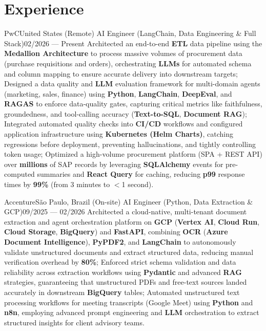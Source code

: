 \section{Experience}
\resumeSubHeadingListStart

\resumeSubheading
{PwC}{United States (Remote)}
{AI Engineer (LangChain, Data Engineering \& Full Stack)}{02/2026 --- Present}
\resumeItemListStart
\resumeItemShort
{Architected an end-to-end \textbf{ETL} data pipeline using the \textbf{Medallion Architecture} to process massive volumes of procurement data (purchase requisitions and orders), orchestrating \textbf{LLMs} for automated schema and column mapping to ensure accurate delivery into downstream targets;}
\resumeItemShort
{Designed a data quality and \textbf{LLM} evaluation framework for multi-domain agents (marketing, sales, finance) using \textbf{Python}, \textbf{LangChain}, \textbf{DeepEval}, and \textbf{RAGAS} to enforce data-quality gates, capturing critical metrics like faithfulness, groundedness, and tool-calling accuracy (\textbf{Text-to-SQL}, \textbf{Document RAG});}
\resumeItemShort
{Integrated automated quality checks into \textbf{CI/CD} workflows and configured application infrastructure using \textbf{Kubernetes (Helm Charts)}, catching regressions before deployment, preventing hallucinations, and tightly controlling token usage;}
\resumeItemShort
{Optimized a high-volume procurement platform (SPA + REST API) over \textbf{millions} of SAP records by leveraging \textbf{SQLAlchemy} events for pre-computed summaries and \textbf{React Query} for caching, reducing \textbf{p99} response times by \textbf{99\%} (from 3 minutes to $<$1 second).}
\resumeItemListEnd

\resumeSubheading
{Accenture}{São Paulo, Brazil (On-site)}
{AI Engineer (Python, Data Extraction \& GCP)}{09/2025 --- 02/2026}
\resumeItemListStart
\resumeItemShort
{Architected a cloud-native, multi-tenant document extraction and agent orchestration platform on \textbf{GCP} (\textbf{Vertex AI}, \textbf{Cloud Run}, \textbf{Cloud Storage}, \textbf{BigQuery}) and \textbf{FastAPI}, combining \textbf{OCR} (\textbf{Azure Document Intelligence}), \textbf{PyPDF2}, and \textbf{LangChain} to autonomously validate unstructured documents and extract structured data, reducing manual verification overhead by \textbf{80\%};}
\resumeItemShort
{Enforced strict schema validation and data reliability across extraction workflows using \textbf{Pydantic} and advanced \textbf{RAG} strategies, guaranteeing that unstructured PDFs and free-text sources landed accurately in downstream \textbf{BigQuery} tables;}
\resumeItemShort
{Automated unstructured text processing workflows for meeting transcripts (Google Meet) using \textbf{Python} and \textbf{n8n}, employing advanced prompt engineering and \textbf{LLM} orchestration to extract structured insights for client advisory teams.}
\resumeItemListEnd

